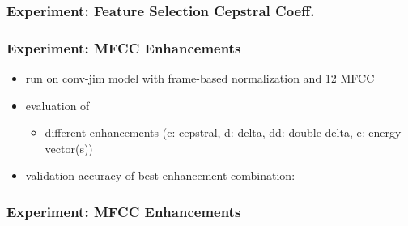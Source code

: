\begin{frame}
  \frametitle{Experiment: Feature Selection Cepstral Coeff.}
  \centering \vfill
  
\end{frame}

\begin{frame}
  \frametitle{Experiment: MFCC Enhancements}
  \begin{itemize}
    \item run on conv-jim model with frame-based normalization and 12 MFCC
    \item evaluation of
    \begin{itemize}
     \item different enhancements (c: cepstral, d: delta, dd: double delta, e: energy vector(s))
    \end{itemize}
    \item validation accuracy of best enhancement combination:
  \end{itemize}
  \vspace{-0.5cm}
  \begin{figure}[!ht]
    \centering
  \end{figure}
\end{frame}

\begin{frame}
  \frametitle{Experiment: MFCC Enhancements}
  \centering \vfill
  
\end{frame}

